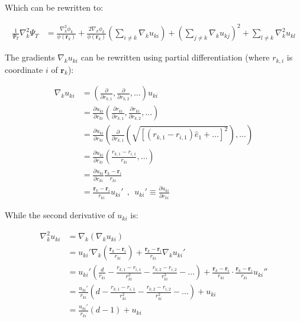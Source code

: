 \documentclass[english, a4paper]{article}
\newcommand{\bm}[1]{\mathbf{#1}}
\begin{document}
Which can be rewritten to:

\begin{align}
	\frac{1}{\Psi_T}\nabla_k^2\Psi_T &= \frac{\nabla_k^2\phi_k}{\phi(\bm{r}_k)} + \frac{2\nabla_k\phi_k}{\phi(\bm{r}_k)}\left(\sum_{i\neq k}\nabla_ku_{ki} \right) + \left(\sum_{j\neq k}\nabla_ku_{kj} \right)^2 + \sum_{l\neq k}\nabla_k^2u_{kl}
\end{align}

The gradients $\nabla_k u_{ki}$ can be rewritten using partial differentiation (where $r_{k,i}$ is coordinate $i$ of $\bm{r}_k$):

\begin{align*}
	\nabla_k u_{ki} &= \left(\frac{\partial}{\partial r_{k,1}}, \frac{\partial}{\partial r_{k,2}}, \ldots\right)u_{ki}\\
	&= \frac{\partial u_{ki}}{\partial r_{ki}}\left(\frac{\partial r_{ki}}{\partial r_{k,1}}, \frac{\partial r_{ki}}{\partial r_{k,2}}, \ldots\right)\\
	&= \frac{\partial u_{ki}}{\partial r_{ki}}\left( \frac{\partial}{\partial r_{k,1}}\left(\sqrt{\left[(r_{k,1}-r_{i,1})\hat{e}_1 + \ldots\right]^2}\right), \ldots \right)\\
	&= \frac{\partial u_{ki}}{\partial r_{ki}}\left(\frac{r_{k,1} - r_{i,1}}{r_{ki}}, \ldots \right)\\
	&= \frac{\partial u_{ki}}{\partial r_{ki}}\frac{\bm{r}_k - \bm{r}_i}{r_{ki}}\\
	&= \frac{\bm{r}_k - \bm{r}_i}{r_{ki}} u_{ki}' \:\:,\:\:  u_{ki}'\equiv \frac{\partial u_{ki}}{\partial r_{ki}}
\end{align*}

While the second derivative of $u_{ki}$ is:

\begin{align*}
	\nabla_k^2 u_{ki} &= \nabla_k(\nabla_ku_{ki})\\
	&= u_{ki}'\nabla_k\left(\frac{\bm{r}_k - \bm{r}_i}{r_{ki}}\right) + \frac{\bm{r}_k - \bm{r}_i}{r_{ki}}\nabla_k u_{ki}'\\
	&= u_{ki}' \left(\frac{d}{r_{ki}} - \frac{r_{k,1}-r_{i,1}}{r_{ki}^3} - \frac{r_{k,2}-r_{i,2}}{r_{ki}^3} - \ldots\right) + \frac{\bm{r}_k - \bm{r}_i}{r_{ki}}\cdot\frac{\bm{r}_k - \bm{r}_i}{r_{ki}} u_{ki}''\\
	&= \frac{u_{ki}'}{r_{ki}} \left(d - \frac{r_{k,1}-r_{i,1}}{r_{ki}^2} - \frac{r_{k,2}-r_{i,2}}{r_{ki}^2} - \ldots\right) + u_{ki}\\
	&= \frac{u_{ki}'}{r_{ki}} \left(d - 1\right) + u_{ki}
\end{align*}
\end{document}
